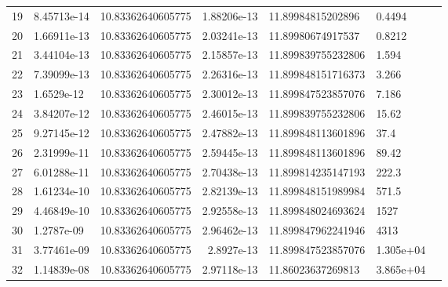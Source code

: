 \begin{tabular}{rllrllr}
19 & 8.45713e-14 & 10.83362640605775 & 1.88206e-13 & 11.89984815202896 & 0.4494\\
20 & 1.66911e-13 & 10.83362640605775 & 2.03241e-13 & 11.89980674917537 & 0.8212\\
21 & 3.44104e-13 & 10.83362640605775 & 2.15857e-13 & 11.899839755232806 & 1.594\\
22 & 7.39099e-13 & 10.83362640605775 & 2.26316e-13 & 11.899848151716373 & 3.266\\
23 & 1.6529e-12 & 10.83362640605775 & 2.30012e-13 & 11.899847523857076 & 7.186\\
24 & 3.84207e-12 & 10.83362640605775 & 2.46015e-13 & 11.899839755232806 & 15.62\\
25 & 9.27145e-12 & 10.83362640605775 & 2.47882e-13 & 11.899848113601896 & 37.4\\
26 & 2.31999e-11 & 10.83362640605775 & 2.59445e-13 & 11.899848113601896 & 89.42\\
27 & 6.01288e-11 & 10.83362640605775 & 2.70438e-13 & 11.899814235147193 & 222.3\\
28 & 1.61234e-10 & 10.83362640605775 & 2.82139e-13 & 11.899848151989984 & 571.5\\
29 & 4.46849e-10 & 10.83362640605775 & 2.92558e-13 & 11.899848024693624 & 1527\\
30 & 1.2787e-09 & 10.83362640605775 & 2.96462e-13 & 11.899847962241946 & 4313\\
31 & 3.77461e-09 & 10.83362640605775 & 2.8927e-13 & 11.899847523857076 & 1.305e+04\\
32 & 1.14839e-08 & 10.83362640605775 & 2.97118e-13 & 11.86023637269813 & 3.865e+04\\
\bottomrule
\end{tabular}
